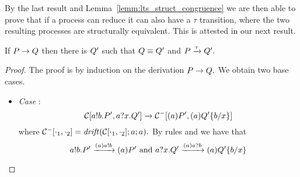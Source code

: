By the last result and Lemma~\ref{lemm:lts_struct_congruence} we are then able to prove that if a process can reduce it can also have a $\tau$ transition, where the two resulting processes are structurally equivalent. This is attested in our next result.

\begin{lemma}{\label{lemm:reduction_tau}}
If $P\rightarrow Q$ then there is $Q'$ such that $Q\equiv Q'$ and $P\xrightarrow{\tau}Q'.$ 
\end{lemma}
\begin{proof}
The proof is by induction on the derivation $P\rightarrow Q.$ We obtain two base cases.
\begin{itemize}
\item \emph{Case} : 
\[
\mathcal{C} [a!b.P',a?x.Q']\rightarrow\mathcal{C}^- [(a)P', (a)Q'\{b/x\} ]
\] 
where $\mathcal{C}^-[\cdot_1, \cdot_2]=\mathit {drift}(\mathcal{C}[\cdot_1, \cdot_2]; a;a).$ By rules  and  we have that 
\[
a!b.P'\xrightarrow{{(a)}a!b}(a)P' \text{ and } 
a?x.Q'\xrightarrow{{(a)}a?b}(a)Q'\{b/x\}
\] 

\end{itemize}
\end{proof}
